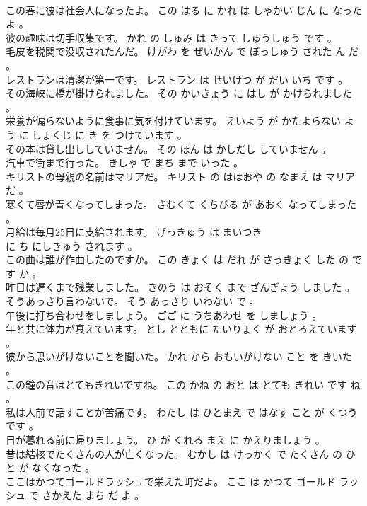 \documentclass[8pt]{extreport}
\begin{document}
\begin{CJK}{UTF8}{min}
\\	この春に彼は社会人になったよ。	この はる に かれ は しゃかい じん に なった よ 。 
\\	彼の趣味は切手収集です。	かれ の しゅみ は きって しゅうしゅう です 。 
\\	毛皮を税関で没収されたんだ。	けがわ を ぜいかん で ぼっしゅう された ん だ 。 
\\	レストランは清潔が第一です。	レストラン は せいけつ が だい いち です 。 
\\	その海峡に橋が掛けられました。	その かいきょう に はし が かけられました 。 
\\	栄養が偏らないように食事に気を付けています。	えいよう が かたよらない よう に しょくじ に き を つけています 。 
\\	その本は貸し出ししていません。	その ほん は かしだし していません 。 
\\	汽車で街まで行った。	きしゃ で まち まで いった 。 
\\	キリストの母親の名前はマリアだ。	キリスト の ははおや の なまえ は マリア だ 。 
\\	寒くて唇が青くなってしまった。	さむくて くちびる が あおく なってしまった 。 
\\	月給は毎月25日に支給されます。	げっきゅう は まいつき 
\\	に ち にしきゅう されます 。 
\\	この曲は誰が作曲したのですか。	この きょく は だれ が さっきょく した の です か 。 
\\	昨日は遅くまで残業しました。	きのう は おそく まで ざんぎょう しました 。 
\\	そうあっさり言わないで。	そう あっさり いわない で 。 
\\	午後に打ち合わせをしましょう。	ごご に うちあわせ を しましょう 。 
\\	年と共に体力が衰えています。	とし とともに たいりょく が おとろえています 。 
\\	彼から思いがけないことを聞いた。	かれ から おもいがけない こと を きいた 。 
\\	この鐘の音はとてもきれいですね。	この かね の おと は とても きれい です ね 。 
\\	私は人前で話すことが苦痛です。	わたし は ひとまえ で はなす こと が くつう です 。 
\\	日が暮れる前に帰りましょう。	ひ が くれる まえ に かえりましょう 。 
\\	昔は結核でたくさんの人が亡くなった。	むかし は けっかく で たくさん の ひと が なくなった 。 
\\	ここはかつてゴールドラッシュで栄えた町だよ。	ここ は かつて ゴールド ラッシュ で さかえた まち だ よ 。 

\end{CJK}
\end{document}
